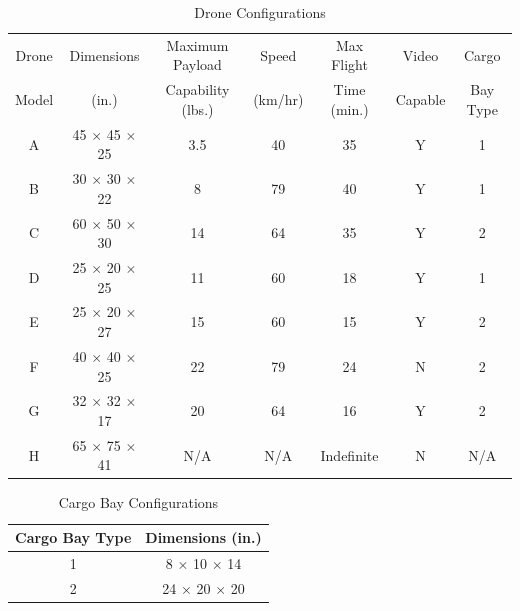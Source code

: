 \begin{table}[h]
    \centering
    \begin{tabular}{c|c|c|c|c|c|c}
    \hline Drone & Dimensions & Maximum Payload & Speed &  Max Flight & Video & Cargo\\
    Model & (in.) & Capability (lbs.) & (km/hr) & Time (min.) & Capable & Bay Type \\
    \hline
    A & 45 $\times$ 45 $\times$ 25 & 3.5 & 40 & 35 & Y & 1 \\
    B & 30 $\times$ 30 $\times$ 22 & 8 & 79 & 40 & Y & 1 \\
    C & 60 $\times$ 50 $\times$ 30 & 14 & 64 & 35 & Y & 2 \\
    D & 25 $\times$ 20 $\times$ 25 & 11 & 60 & 18 & Y & 1 \\
    E & 25 $\times$ 20 $\times$ 27 & 15 & 60 & 15 & Y & 2 \\
    F & 40 $\times$ 40 $\times$ 25 & 22 & 79 & 24 & N & 2 \\
    G & 32 $\times$ 32 $\times$ 17 & 20 & 64 & 16 & Y & 2 \\
    H & 65 $\times$ 75 $\times$ 41 & N/A & N/A & Indefinite & N & N/A \\
    \end{tabular}
    \caption{Drone Configurations}
    \label{tab:drones_info}
\end{table}

\begin{table}[h]
    \centering
    \begin{tabular}{c|c}
    \hline Cargo Bay Type & Dimensions (in.) \\
    \hline 1 & 8 $\times$ 10 $\times$ 14 \\
    2 & 24 $\times$ 20 $\times$ 20
    \end{tabular}
    \caption{Cargo Bay Configurations}
    \label{tab:cargo_bay_config}
\end{table}

